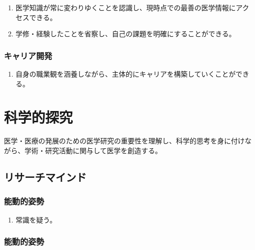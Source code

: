 \begin{enumerate}
\def\labelenumi{\arabic{enumi}.}
\tightlist
\item
  医学知識が常に変わりゆくことを認識し、現時点での最善の医学情報にアクセスできる。
\item
  学修・経験したことを省察し、自己の課題を明確にすることができる。
\end{enumerate}

\hypertarget{ux30adux30e3ux30eaux30a2ux958bux767a}{%
\subsubsection{キャリア開発}\label{ux30adux30e3ux30eaux30a2ux958bux767a}}

\begin{enumerate}
\def\labelenumi{\arabic{enumi}.}
\tightlist
\item
  自身の職業観を涵養しながら、主体的にキャリアを構築していくことができる。
\end{enumerate}

\newpage

\hypertarget{ux79d1ux5b66ux7684ux63a2ux7a76}{%
\section{科学的探究}\label{ux79d1ux5b66ux7684ux63a2ux7a76}}

医学・医療の発展のための医学研究の重要性を理解し、科学的思考を身に付けながら、学術・研究活動に関与して医学を創造する。

\hypertarget{ux30eaux30b5ux30fcux30c1ux30deux30a4ux30f3ux30c9}{%
\subsection{リサーチマインド}\label{ux30eaux30b5ux30fcux30c1ux30deux30a4ux30f3ux30c9}}

\hypertarget{ux80fdux52d5ux7684ux59ffux52e2}{%
\subsubsection{能動的姿勢}\label{ux80fdux52d5ux7684ux59ffux52e2}}

\begin{enumerate}
\def\labelenumi{\arabic{enumi}.}
\tightlist
\item
  常識を疑う。
\end{enumerate}

\hypertarget{ux80fdux52d5ux7684ux59ffux52e2-1}{%
\subsubsection{能動的姿勢}\label{ux80fdux52d5ux7684ux59ffux52e2-1}}

